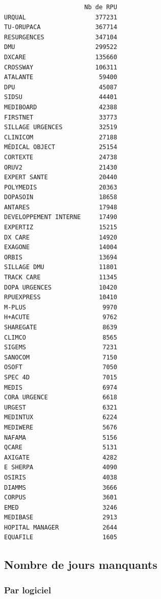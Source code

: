 \documentclass[]{article}
\begin{document}
\begin{verbatim}
                      Nb de RPU
URQUAL                   377231
TU-ORUPACA               367714
RESURGENCES              347104
DMU                      299522
DXCARE                   135660
CROSSWAY                 106311
ATALANTE                  59400
DPU                       45087
SIDSU                     44401
MEDIBOARD                 42388
FIRSTNET                  33773
SILLAGE URGENCES          32519
CLINICOM                  27188
MÉDICAL OBJECT            25154
CORTEXTE                  24738
ORUV2                     21430
EXPERT SANTE              20440
POLYMEDIS                 20363
DOPASOIN                  18658
ANTARES                   17948
DEVELOPPEMENT INTERNE     17490
EXPERTIZ                  15215
DX CARE                   14920
EXAGONE                   14004
ORBIS                     13694
SILLAGE DMU               11801
TRACK CARE                11345
DOPA URGENCES             10420
RPUEXPRESS                10410
M-PLUS                     9970
H+ACUTE                    9762
SHAREGATE                  8639
CLIMCO                     8565
SIGEMS                     7231
SANOCOM                    7150
OSOFT                      7050
SPEC 4D                    7015
MEDIS                      6974
CORA URGENCE               6618
URGEST                     6321
MEDINTUX                   6224
MEDIWERE                   5676
NAFAMA                     5156
QCARE                      5131
AXIGATE                    4282
E SHERPA                   4090
OSIRIS                     4038
DIAMMS                     3666
CORPUS                     3601
EMED                       3246
MEDIBASE                   2913
HOPITAL MANAGER            2644
EQUAFILE                   1605
\end{verbatim}

\subsection{Nombre de jours manquants}\label{nombre-de-jours-manquants}

\subsubsection{Par logiciel}\label{par-logiciel}
\end{document}
